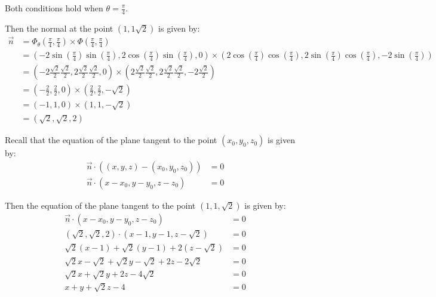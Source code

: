 \begin{solution}
Both conditions hold when \(\theta = \frac{\pi}{4}\).

Then the normal at the point \((1, 1 \sqrt{2})\) is given by:
\begin{align*}
    \vec{n} &= \Phi_\theta\left(\frac{\pi}{4}, \frac{\pi}{4}\right) \times \Phi\left(\frac{\pi}{4}, \frac{\pi}{4}\right) \\
    &= \left(-2\sin\left(\frac{\pi}{4}\right)\sin\left(\frac{\pi}{4}\right), 2\cos\left(\frac{\pi}{4}\right)\sin\left(\frac{\pi}{4}\right), 0\right) \times \left(2\cos\left(\frac{\pi}{4}\right)\cos\left(\frac{\pi}{4}\right), 2\sin\left(\frac{\pi}{4}\right)\cos\left(\frac{\pi}{4}\right), -2\sin\left(\frac{\pi}{4}\right)\right) \\
    &= \left(-2\frac{\sqrt{2}}{2}\frac{\sqrt{2}}{2}, 2\frac{\sqrt{2}}{2}\frac{\sqrt{2}}{2}, 0\right) \times \left(2\frac{\sqrt{2}}{2}\frac{\sqrt{2}}{2}, 2\frac{\sqrt{2}}{2}\frac{\sqrt{2}}{2}, -2\frac{\sqrt{2}}{2}\right) \\
    &= \left(-\frac{2}{2}, \frac{2}{2}, 0\right) \times \left(\frac{2}{2}, \frac{2}{2}, -\sqrt{2}\right) \\
    &= \left(-1, 1, 0\right) \times \left(1, 1, -\sqrt{2}\right) \\
    &= \left(\sqrt{2}, \sqrt{2}, 2\right)
\end{align*}

Recall that the equation of the plane tangent to the point \((x_0, y_0, z_0)\) is given by:
    \begin{align}
        \vec{n} \cdot \left((x, y, z) - (x_0, y_0, z_0)\right) &= 0 \\
        \vec{n} \cdot \left(x - x_0, y - y_0, z - z_0\right) &= 0
    \end{align}
    
    Then the equation of the plane tangent to the point \(\left(1, 1, \sqrt{2}\right)\) is given by:
    \begin{align*}
        \vec{n} \cdot \left(x - x_0, y - y_0, z - z_0\right) &= 0 \\
        \left(\sqrt{2}, \sqrt{2}, 2\right) \cdot \left(x - 1, y - 1, z - \sqrt{2}\right) &= 0 \\
        \sqrt{2}(x - 1) + \sqrt{2}(y - 1) + 2\left(z - \sqrt{2}\right) &= 0 \\
        \sqrt{2}x - \sqrt{2} + \sqrt{2}y - \sqrt{2} + 2z - 2\sqrt{2} &= 0 \\
        \sqrt{2}x + \sqrt{2}y + 2z - 4\sqrt{2} &= 0 \\
        x + y + \sqrt{2}z - 4 &= 0
    \end{align*}

\end{solution}

